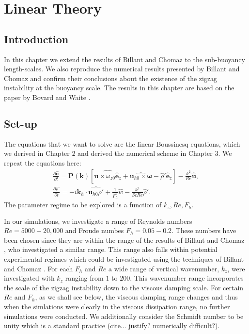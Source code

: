 \chapter{Linear Theory}

\section{Introduction}
In this chapter we extend the results of Billant and Chomaz \cite{bc2000c} to the sub-buoyancy length-scales. We also reproduce the numerical results presented by Billant and Chomaz and confirm their conclusions about the existence of the zigzag instability at the buoyancy scale. The results in this chapter are based on the paper by Bovard and Waite \cite{bovard2013}.

\section{Set-up}
The equations that we want to solve are the linear Boussinesq equations, which we derived in Chapter 2 and derived the numerical scheme in Chapter 3. We repeat the equations here:
\begin{align}
\frac{\partial \hat{\bm{u}}}{\partial t} = \textbf{P}(\textbf{k})[\widehat{\bm{u}\times \omega_{z0}\hat{\bm{e}}_{z}} + \widehat{\bm{u}_{h0}\times\bm{\omega}}-\hat{\rho}'\hat{\bm{e}}_{z}] - \frac{k^{2}}{Re}\hat{\bm{u}},\label{solve1}\\
\frac{\partial\hat{\rho}'}{\partial t} = -i\bm{k}_{h}\cdot\widehat{\bm{u}_{h0}\rho'} + \frac{1}{F_{h}^{2}}\hat{w}- \frac{k^{2}}{ScRe}\hat{\rho}'.
\end{align} 
The parameter regime to be explored is a function of $k_{z},Re,F_{h}$. 

In our simulations, we investigate a range of Reynolds numbers $Re=5000-20{,}000$ and Froude numbes $F_{h}=0.05-0.2$. These numbers have been chosen since they are within the range of the results of Billant and Chomaz \cite{bc2000c}, who investigated a similar range. This range also falls within potential experimental regimes which could be investigated using the techniques of Billant and Chomaz \cite{bc2000a}. For each $F_{h}$ and $Re$ a wide range of vertical wavenumber, $k_{z}$, were investigated with $k_{z}$ ranging from $1$ to $200$. This wavenumber range incorporates the scale of the zigzag instability down to the viscous damping scale. For certain $Re$ and $F_{h}$, as we shall see below, the viscous damping range changes and thus when the simlations were clearly in the viscous dissipation range, no further simulations were conducted.  We additionally consider the Schmidt number to be unity which is a standard practice (cite... justify? numerically difficult?). 

